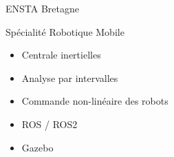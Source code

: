 \begin{frame}{ENSTA Bretagne}{}
\begin{minipage}{0.45\textwidth}
\begin{block}{Spécialité Robotique Mobile}
\begin{itemize}
                \item Centrale inertielles \\
                \item Analyse par intervalles \\
                \item Commande non-linéaire des robots \\
                \item ROS / ROS2 \\
                \item Gazebo
            \end{itemize}
        \end{block}
    \end{minipage}
\end{frame}